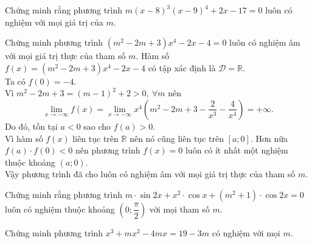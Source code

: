 \begin{bt}%
	Chứng minh rằng phương trình $m(x-8)^3(x-9)^4+2x-17=0$ luôn có nghiệm với mọi giá trị của $m$.
\end{bt}
\begin{bt}%
Chứng minh phương trình $\left(m^2-2m+3\right)x^4-2x-4=0$ luôn có nghiệm âm với mọi giá trị thực của tham số $m$.
\loigiai
{Hàm số $f(x)=\left(m^2-2m+3\right)x^4-2x-4$ có tập xác định là $\mathscr{D}=\mathbb{R}$.\\
Ta có $f(0)=-4$.\\
Vì $m^2-2m+3=(m-1)^2+2>0,\ \forall m$ nên $$\lim\limits_{x\to -\infty} f(x)=\lim\limits_{x\to -\infty} x^4\left(m^2-2m+3-\dfrac{2}{x^3}-\dfrac{4}{x^4}\right)=+\infty.$$
Do đó, tồn tại $a<0$ sao cho $f(a)>0$.\\
Vì hàm số $f(x)$ liên tục trên $\mathbb{R}$ nên nó cũng liên tục trên $[a; 0]$. Hơn nữa $f(a)\cdot f(0)<0$ nên phương trình $f(x)=0$ luôn có ít nhất một nghiệm thuộc khoảng $(a; 0)$.\\
Vậy phương trình đã cho luôn có nghiệm âm với mọi giá trị thực của tham số $m$.
}
\end{bt}
\begin{bt}%
	Chứng minh rằng phương trình $m\cdot\sin 2x+x^2\cdot\cos x+\left(m^2+1\right)\cdot\cos 2x=0$ luôn có nghiệm thuộc khoảng $\left(0 ;\dfrac{\pi}{2}\right)$ với mọi tham số $m$.
\end{bt}
\begin{bt}%
	Chứng minh phương trình $x^3+m x^2-4m x=19-3m$ có nghiệm với mọi $m$.
\end{bt}

